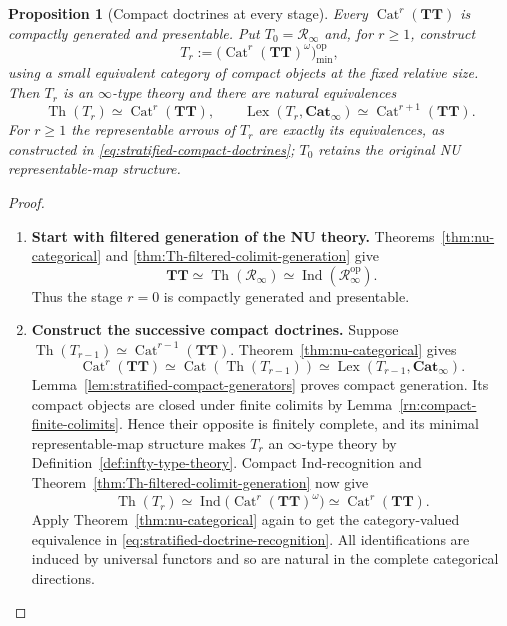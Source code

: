 \documentclass[oneside]{article}
\theoremstyle{plain}
\newtheorem{proposition}[theorem]{Proposition}
\theoremstyle{definition}
\theoremstyle{remark}
\newcommand{\Cat}{\mathbf{Cat}_{\infty}}
\newcommand{\Ind}{\operatorname{Ind}}
\newcommand{\Lex}{\operatorname{Lex}}
\newcommand{\RNU}{\mathcal R_{\infty}}
\newcommand{\TT}{\mathbf{TT}}
\newcommand{\Th}{\operatorname{Th}}
\newcommand{\minrep}{\mathrm{min}}
\newcommand{\op}{\mathrm{op}}
\begin{document}
\begin{proposition}[Compact doctrines at every stage]
\label{prop:stratified-compact-doctrines}
Every $\operatorname{Cat}^r(\TT)$ is compactly generated and
presentable.  Put $T_0=\RNU$ and, for $r\geq1$, construct
\begin{equation}\label{eq:stratified-compact-doctrines}
 T_r:=\bigl(\operatorname{Cat}^r(\TT)^\omega\bigr)^{\op}_{\minrep},
\end{equation}
using a small equivalent category of compact objects at the fixed
relative size.  Then $T_r$ is an $\infty$-type theory and there are
natural equivalences
\begin{equation}\label{eq:stratified-doctrine-recognition}
 \Th(T_r)\simeq\operatorname{Cat}^r(\TT),
 \qquad
 \Lex(T_r,\Cat)\simeq\operatorname{Cat}^{r+1}(\TT).
\end{equation}
For $r\geq1$ the representable arrows of $T_r$ are exactly its
equivalences, as constructed in \eqref{eq:stratified-compact-doctrines};
$T_0$ retains the original NU representable-map structure.
\end{proposition}
\begin{proof}
\leavevmode
\begin{enumerate}
\item \textbf{Start with filtered generation of the NU theory.}
Theorems~\ref{thm:nu-categorical} and
\ref{thm:Th-filtered-colimit-generation} give
\[
 \TT\simeq\Th(\RNU)\simeq\Ind(\RNU^{\op}).
\]
Thus the stage $r=0$ is compactly generated and presentable.
\item \textbf{Construct the successive compact doctrines.}
Suppose $\Th(T_{r-1})\simeq\operatorname{Cat}^{r-1}(\TT)$.
Theorem~\ref{thm:nu-categorical} gives
\[
 \operatorname{Cat}^r(\TT)
 \simeq\operatorname{Cat}(\Th(T_{r-1}))
 \simeq\Lex(T_{r-1},\Cat).
\]
Lemma~\ref{lem:stratified-compact-generators} proves compact generation.
Its compact objects are closed under finite colimits by
Lemma~\ref{rn:compact-finite-colimits}.  Hence their opposite is
finitely complete, and its minimal representable-map structure makes
$T_r$ an $\infty$-type theory by Definition~\ref{def:infty-type-theory}.
Compact Ind-recognition and Theorem~\ref{thm:Th-filtered-colimit-generation}
now give
\[
 \Th(T_r)
 \simeq\Ind\bigl(\operatorname{Cat}^r(\TT)^\omega\bigr)
 \simeq\operatorname{Cat}^r(\TT).
\]
Apply Theorem~\ref{thm:nu-categorical} again to get the category-valued
equivalence in \eqref{eq:stratified-doctrine-recognition}.  All
identifications are induced by universal functors and so are natural
in the complete categorical directions.\qedhere
\end{enumerate}
\end{proof}
\end{document}
